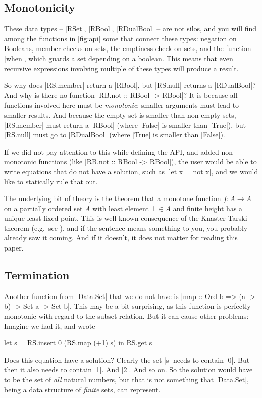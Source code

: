 \documentclass[manuscript,screen,acmsmall,nonacm]{acmart}
\begin{document}
\subsection{Monotonicity}\label{sec:monotonicity}

These data types -- |RSet|, |RBool|, |RDualBool| -- are not silos, and you will find among the functions in \cref{fig:api} some that connect these types: negation on Booleans, member checks on sets, the emptiness check on sets, and the function |when|, which guards a set depending on a boolean.
This means that even recursive expressions involving multiple of these types will produce a result.

So why does |RS.member| return a |RBool|, but |RS.null| returns a |RDualBool|? And why is there no function |RB.not :: RBool -> RBool|? It is because all functions involved here must be \emph{monotonic}: smaller arguments must lead to smaller results. And because the empty set is smaller than non-empty sets, |RS.member| must return a |RBool| (where |False| is smaller than |True|), but |RS.null| must go to |RDualBool| (where |True| is smaller than |False|).

If we did not pay attention to this while defining the API, and added non-monotonic functions (like |RB.not :: RBool -> RBool|), the user would be  able to write equations that do not have a solution, such as
|let x = not x|,
and we would like to statically rule that out.

The underlying bit of theory is the theorem that a monotone function $f : A \to A$ on a partially ordered set $A$ with least element $\bot \in A$ and finite height has a unique least fixed point. This is well-known consequence of the Knaster-Tarski theorem (e.g.\ see \citep{lazyleast}), and if the sentence means something to you, you probably already saw it coming. And if it doesn't, it does not matter for reading this paper.


\subsection{Termination}

Another function from |Data.Set| that we do not have is
|map :: Ord b => (a -> b) -> Set a -> Set b|. This may be a bit surprising, as this function is perfectly monotonic with regard to the subset relation. But it can cause other problems: Imagine we had it, and wrote
\begin{code}
let s = RS.insert 0 (RS.map (+1) s) in RS.get s
\end{code}
Does this equation have a solution? Clearly the set |s| needs to contain |0|. But then it also needs to contain |1|. And |2|. And so on. So the solution would have to be the set of \emph{all} natural numbers, but that is not something that |Data.Set|, being a data structure of \emph{finite} sets, can represent.
\end{document}
